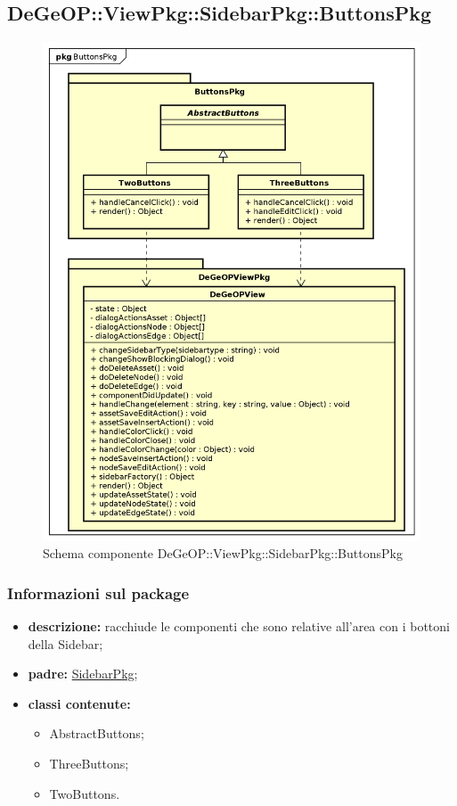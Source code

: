 \subsection{DeGeOP::ViewPkg::SidebarPkg::ButtonsPkg}
\label{pkg::ButtonsPkg}
\begin{figure}[H]
	\centering
	\includegraphics[width=\textwidth]{img/PkgDiagram/ButtonsPkg.png}
	\caption{Schema componente DeGeOP::ViewPkg::SidebarPkg::ButtonsPkg}
\end{figure}
\subsubsection{Informazioni sul package}
\begin{itemize}
	\item \textbf{descrizione:} racchiude le componenti che sono relative all'area con i bottoni della Sidebar;
	\item \textbf{padre:} \hyperref[pkg::SidebarPkg]{SidebarPkg};
	\item \textbf{classi contenute:}
	\begin{itemize}
		\item AbstractButtons;
		\item ThreeButtons;
		\item TwoButtons.
	\end{itemize}
\end{itemize}
